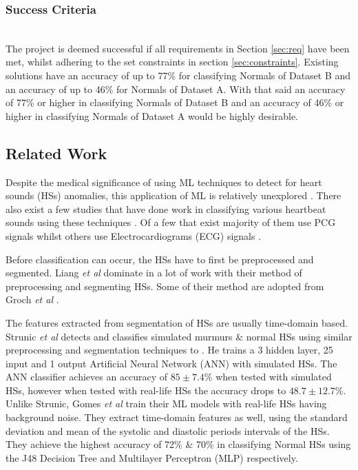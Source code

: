 \documentclass[10pt,twocolumn]{witseiepaper}
\begin{document}
\subsubsection{Success Criteria}
\textcolor{white}{O re swarele...}\\
The project is deemed successful if all requirements in Section \ref{sec:req} have been met, whilst adhering to the set constraints in section \ref{sec:constraints}. Existing solutions
have an accuracy of up to 77\% for classifying Normals of Dataset B and an accuracy of up to 46\%
for Normals of Dataset A. With that said an accuracy of 77\% or higher in classifying Normals of Dataset B and
an accuracy of 46\% or higher in classifying Normals of Dataset A would be highly desirable.

\subsection{Related Work}
\label{sec:lit}
Despite the medical significance of using ML techniques to detect for heart sounds (HSs) anomalies, this application of ML is relatively unexplored \cite{bentley}. There also exist a few studies that have done work in classifying various heartbeat sounds using these techniques \cite{26}. Of a few that exist majority of them use PCG signals \cite{53,51,36,37} whilst others use Electrocardiograms (ECG) signals \cite{4,5}. 

Before classification can occur, the HSs have to first be preprocessed and segmented. Liang \textit{et al} \cite{6} dominate in a lot of work \cite{11,19,15,50} with their method of preprocessing and segmenting HSs. Some of their method are adopted from Groch \textit{et al} \cite{2}. 

The features extracted from segmentation of HSs are usually time-domain based. Strunic \textit{et al} \cite{3} detects and classifies simulated murmurs \& normal HSs using similar preprocessing and segmentation techniques to \cite{6}. He trains a 3 hidden layer, 25 input and 1 output Artificial Neural Network (ANN) with simulated HSs. The ANN classifier achieves an accuracy of $85\pm7.4\%$ when tested with simulated HSs, however when tested with real-life HSs the accuracy drops to $48.7\pm12.7\%$. Unlike Strunic, Gomes \textit{et al} \cite{gomes2012classifying} train their ML models with real-life HSs having background noise. They extract time-domain features as well, using the standard deviation and mean of the systolic and diastolic periods intervals of the HSs. They achieve the highest accuracy of 72\% \& 70\% in classifying Normal HSs using the J48 Decision Tree and Multilayer Perceptron (MLP) respectively.
\end{document}
